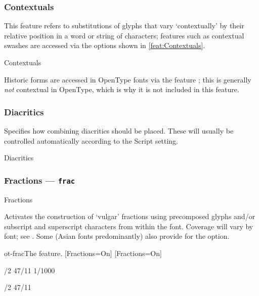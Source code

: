 \documentclass[a4paper]{l3doc}
\begin{document}
\subsubsection{Contextuals}
This feature refers to substitutions of glyphs that vary `contextually' by their relative position in a word or string of characters;
features such as contextual swashes are accessed via the options shown in \ref{feat:Contextuals}.

\begin{features}{Contextuals}
\end{features}

Historic forms are accessed in OpenType
fonts via the feature ; this is generally \emph{not}
contextual in OpenType, which is why it is not included in this feature.


\subsubsection{Diacritics}

Specifies how combining diacritics should be placed.
These will usually be controlled automatically
according to the Script setting.

\begin{features}{Diacritics}
\end{features}


\subsubsection{Fractions --- \texttt{frac}}

\begin{features}{Fractions}
\end{features}

Activates the construction of `vulgar' fractions using precomposed glyphs and/or
subscript and superscript characters from within the font.
Coverage will vary by font; see .
Some (Asian fonts predominantly) also provide for the  option.

\begin{Lexample}{ot-frac}{The  feature.}
\setsansfont{IBMPlexSans-Regular.otf}[Fractions=On]
\setmonofont{IBMPlexMono-Regular.otf}[Fractions=On]

/2 47/11 1/1000 \par
{}/2 47/11
\end{Lexample}
\end{document}
